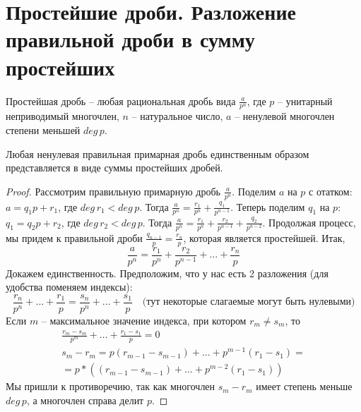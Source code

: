\section{Простейшие дроби. Разложение правильной дроби в сумму простейших}
\begin{conj}
    Простейшая дробь -- любая рациональная дробь вида $\frac{a}{p^n}$, где $p$ -- унитарный неприводимый многочлен, 
    $n$ -- натуральное число, $a$ -- ненулевой многочлен степени меньшей $deg \, p$. 
\end{conj}

\begin{theorem-non}
    Любая ненулевая правильная примарная дробь единственным образом представляется в виде суммы простейших дробей.
\end{theorem-non}

\begin{proof}
    Рассмотрим правильную примарную дробь $\frac{a}{p^n}$. 
    Поделим $a$ на $p$ с отатком: $a = q_1p + r_1$, где $deg \, r_1 < deg \, p$. 
    Тогда $\frac{a}{p^n} = \frac{r_1}{p^n} + \frac{q_1}{p^{n - 1}}$. 
    Теперь поделим $q_1$ на $p$: $q_1 = q_2p + r_2$, где $deg \, r_2 < deg \, p$.
    Тогда $\frac{a}{p^n} = \frac{r_1}{p^n} + \frac{r_2}{p^{n - 1}} + \frac{q_2}{p^{n - 2}}$.
    Продолжая процесс, мы придем к правильной дроби $\frac{q_{n - 1}}{p} = \frac{r_n}{p}$, которая является простейшей. 
    Итак, \[ \frac{a}{p^n} = \frac{r_1}{p^n} + \frac{r_2}{p^{n - 1}} + \dots + \frac{r_n}{p} \]
    Докажем единственность. 
    Предположим, что у нас есть 2 разложения (для удобства поменяем индексы):
    \[ \frac{r_n}{p^n} + \dots + \frac{r_1}{p} = \frac{s_n}{p^n} + \dots + \frac{s_1}{p} \quad \text{(тут некоторые слагаемые могут быть нулевыми)} \]
    Если $m$ -- максимальное значение индекса, при котором $r_m \neq s_m$, то 
    \begin{gather*}
        \frac{r_m - s_m}{p^m} + \dots + \frac{r_1 - s_1}{p} = 0 \\
        s_m - r_m = p(r_{m - 1} - s_{m - 1}) + \dots + p^{m - 1}(r_1 - s_1) = \\
        = p * ((r_{m - 1} - s_{m - 1}) + \dots + p^{m - 2}(r_1 - s_1))
    \end{gather*}
    Мы пришли к противоречию, так как многочлен $s_m - r_m$ имеет степень меньше $deg \, p$, а многочлен справа делит $p$.
\end{proof}

\vspace{7mm}

